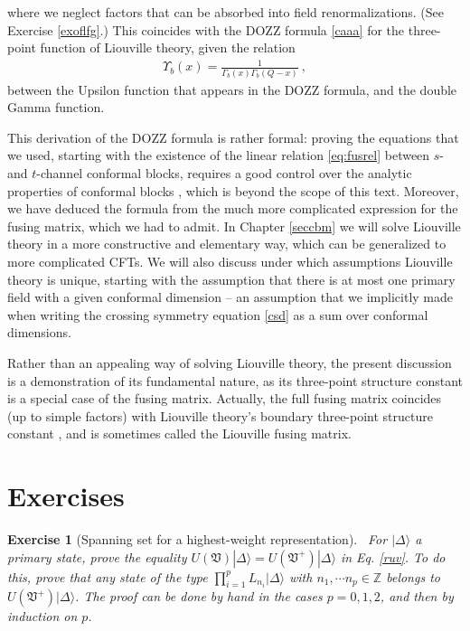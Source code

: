 \documentclass[12pt, a4paper, notitlepage, twoside]{report}
\numberwithin{equation}{section}
\theoremstyle{break}
\newtheorem{exo}{Exercise}[chapter]
\begin{document}
where we neglect factors that can be absorbed into field renormalizations. (See Exercise \ref{exoflfg}.) This  coincides with the DOZZ formula \eqref{caaa} for the three-point function of Liouville theory, given the relation 
\begin{align}
 \Upsilon_b(x) = \frac{1}{\Gamma_b(x)\Gamma_b(Q-x)}\ ,
 \label{eq:upga}
\end{align}
between the Upsilon function that appears in the DOZZ formula, and the double Gamma function.

This derivation of the DOZZ formula is rather formal: proving the equations that we used, starting with the existence of the linear  relation \eqref{eq:fusrel} between $s$- and $t$-channel conformal blocks, requires a good control over the analytic properties of conformal blocks \cite{tv12}, which is beyond the scope of this text. Moreover, we have deduced the formula from the much more complicated expression for the fusing matrix, which we had to admit. In Chapter \ref{seccbm} we will solve Liouville theory in a more constructive and elementary way, which can be generalized to more complicated CFTs. We will also discuss under which assumptions Liouville theory is unique, starting with the assumption that there is at most one primary field with a given conformal dimension -- an assumption that we implicitly made when writing the crossing symmetry equation \eqref{csd} as a sum over conformal dimensions.

Rather than an appealing way of solving Liouville theory, the present discussion is a demonstration of its fundamental nature, as its three-point structure constant is a special case of the fusing matrix. Actually, the full fusing matrix coincides (up to simple factors) with Liouville theory's boundary three-point structure constant \cite{pt01}, and is sometimes called the Liouville fusing matrix. 


\section{Exercises}

\begin{exo}[Spanning set for a highest-weight representation]
 ~\label{exospan}
For $|\Delta\rangle$ a primary state, prove the equality $U(\mathfrak{V})|\Delta\rangle =U(\mathfrak{V}^+)|\Delta\rangle$ in Eq. \eqref{ruv}.
To do this, prove that any state of the type $\prod_{i=1}^p L_{n_i}|\Delta\rangle$ with $n_1,\cdots n_p\in {\mathbb{Z}}$ belongs to $U(\mathfrak{V}^+)|\Delta\rangle$.
The proof can be done by hand in the cases $p=0,1,2$, and then by induction on $p$.
\end{exo}
\end{document}
